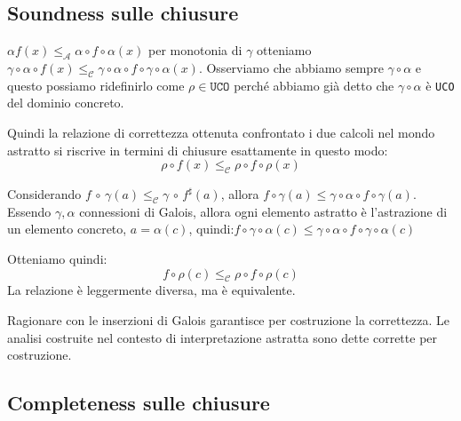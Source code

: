 \subsection{Soundness sulle chiusure}
$\alpha f(x) \leq_\mathcal{A} \alpha \circ f \circ \alpha(x)$ per monotonia di $\gamma$ 
otteniamo $\gamma \circ \alpha \circ f(x) \leq_\mathcal{C} \gamma \circ \alpha
\circ f \circ \gamma \circ \alpha(x)$. Osserviamo che abbiamo sempre $\gamma \circ \alpha$
e questo possiamo ridefinirlo come $\rho \in \texttt{UCO}$ perché abbiamo già detto che  
$\gamma \circ \alpha$ è \texttt{UCO} del dominio concreto. 

Quindi la relazione di correttezza ottenuta confrontato i due calcoli nel mondo 
astratto si riscrive in termini di chiusure esattamente in questo modo:
\[
    \rho \circ f(x) \leq_\mathcal{C} \rho \circ f \circ \rho(x)
\]

Considerando $f \, \circ \, \gamma(a) \leq_\mathcal{C} \gamma \, \circ \, f^\sharp(a)$, allora
$f \circ \gamma(a) \leq \gamma \circ \alpha \circ f \circ \gamma(a)$. Essendo $\gamma, \alpha$ 
connessioni di Galois, allora ogni elemento astratto è l'astrazione di un elemento concreto, 
$a = \alpha(c)$, quindi:$f \circ \gamma \circ \alpha(c) \leq \gamma
\circ \alpha \circ f \circ \gamma \circ \alpha(c)$

Otteniamo quindi:
\[
  f \circ \rho(c) \leq_\mathcal{C} \rho \circ f \circ \rho(c)
\]
La relazione è leggermente diversa, ma è equivalente. 

\begin{tcolorbox}
    Ragionare con le inserzioni di Galois garantisce per costruzione la correttezza.
    Le analisi costruite nel contesto di interpretazione astratta sono dette 
    corrette per costruzione.
\end{tcolorbox}
\subsection{Completeness sulle chiusure}
